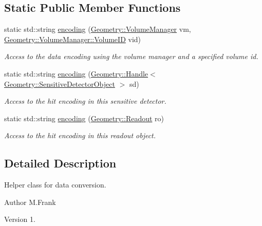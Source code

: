 \subsection*{Static Public Member Functions}
\begin{DoxyCompactItemize}
\item 
static std\+::string \hyperlink{class_d_d4hep_1_1_simulation_1_1_geant4_conversion_helper_a0a26b1a641a6b57ba1d5f92d941e9809}{encoding} (\hyperlink{class_d_d4hep_1_1_geometry_1_1_volume_manager}{Geometry\+::\+Volume\+Manager} vm, \hyperlink{class_d_d4hep_1_1_geometry_1_1_volume_manager_ab1f746b561c93be38bc7c6e66fc8ca8a}{Geometry\+::\+Volume\+Manager\+::\+Volume\+ID} vid)
\begin{DoxyCompactList}\small\item\em Access to the data encoding using the volume manager and a specified volume id. \end{DoxyCompactList}\item 
static std\+::string \hyperlink{class_d_d4hep_1_1_simulation_1_1_geant4_conversion_helper_a90f912fdcfa4e17d2179e714318b53e4}{encoding} (\hyperlink{class_d_d4hep_1_1_handle}{Geometry\+::\+Handle}$<$ \hyperlink{class_d_d4hep_1_1_geometry_1_1_sensitive_detector_object}{Geometry\+::\+Sensitive\+Detector\+Object} $>$ sd)
\begin{DoxyCompactList}\small\item\em Access to the hit encoding in this sensitive detector. \end{DoxyCompactList}\item 
static std\+::string \hyperlink{class_d_d4hep_1_1_simulation_1_1_geant4_conversion_helper_aba7692df239d8234dbab1ad724b149a3}{encoding} (\hyperlink{class_d_d4hep_1_1_geometry_1_1_readout}{Geometry\+::\+Readout} ro)
\begin{DoxyCompactList}\small\item\em Access to the hit encoding in this readout object. \end{DoxyCompactList}\end{DoxyCompactItemize}


\subsection{Detailed Description}
Helper class for data conversion. 

\begin{DoxyAuthor}{Author}
M.\+Frank 
\end{DoxyAuthor}
\begin{DoxyVersion}{Version}
1. 
\end{DoxyVersion}


